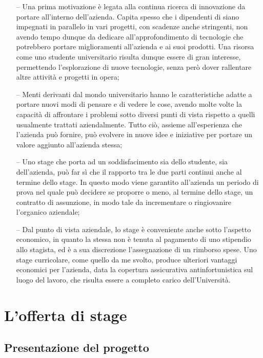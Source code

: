 \begin{itemize}
	\item[--] {Una prima motivazione è legata alla continua ricerca di innovazione da portare all'interno dell'azienda. Capita spesso che i dipendenti di \nomeAzienda siano impegnati in parallelo in vari progetti, con scadenze anche stringenti, non avendo tempo dunque da dedicare all'approfondimento di tecnologie che potrebbero portare miglioramenti all'azienda e ai suoi prodotti. Una risorsa come uno studente universitario risulta dunque essere di gran interesse, permettendo l'esplorazione di nuove tecnologie, senza però dover rallentare altre attività e progetti in opera;}

	\item[--] {Menti derivanti dal mondo universitario hanno le caratteristiche adatte a portare nuovi modi di pensare e di vedere le cose, avendo molte volte la capacità di affrontare i problemi sotto diversi punti di vista rispetto a quelli usualmente trattati aziendalmente. Tutto ciò, assieme all'esperienza che l'azienda può fornire, può evolvere in nuove idee e iniziative per portare un valore aggiunto all'azienda stessa;}
	
	\item[--] {Uno stage che porta ad un soddisfacimento sia dello studente, sia dell'azienda, può far sì che il rapporto tra le due parti continui anche al termine dello stage. In questo modo viene garantito all'azienda un periodo di prova nel quale può decidere se proporre o meno, al termine dello stage, un contratto di assunzione, in modo tale da incrementare o ringiovanire l'organico aziendale;}
	
	\item[--] {Dal punto di vista aziendale, lo stage è conveniente anche sotto l'aspetto economico, in quanto la stessa non è tenuta al pagamento di uno stipendio allo stagista, ed è a sua discrezione l'assegnazione di un rimborso spese. Uno stage curricolare, come quello da me svolto, produce ulteriori vantaggi economici per l'azienda, data la copertura assicurativa antinfortunistica sul luogo del lavoro, che risulta essere a completo carico dell'Università.}
	
\end{itemize}

\section{L'offerta di stage}

	\subsection{Presentazione del progetto}

